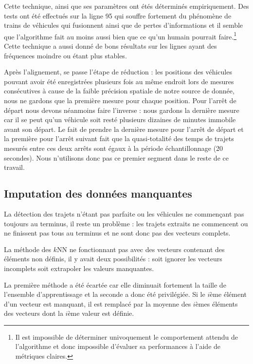 \documentclass[letterpaper]{article}
\begin{document}
\begin{appendices}
Cette technique, ainsi que ses paramètres ont étés déterminés empiriquement. Des tests ont été effectués sur la ligne 95 qui souffre fortement du phénomène de trains de véhicules qui fusionnent ainsi que de pertes d'informations et il semble que l'algorithme fait au moins aussi bien que ce qu'un humain pourrait faire.\footnote{Il est impossible de déterminer univoquement le comportement attendu de l'algorithme et donc impossible d'évaluer sa performances à l'aide de métriques claires.} Cette technique a aussi donné de bons résultats sur les lignes ayant des fréquences moindre ou étant plus stables.

Après l'alignement, se passe l'étape de réduction : les positions des véhicules pouvant avoir été enregistrées plusieurs fois au même endroit lors de mesures consécutives à cause de la faible précision spatiale de notre source de donnée, nous ne gardons que la première mesure pour chaque position. Pour l'arrêt de départ nous devons néanmoins faire l'inverse : nous gardons la dernière mesure car il se peut qu'un véhicule soit resté plusieurs dizaines de minutes immobile avant son départ. Le fait de prendre la dernière mesure pour l'arrêt de départ et la première pour l'arrêt suivant fait que la quasi-totalité des temps de trajets mesurés entre ces deux arrêts sont égaux à la période échantillonnage (20 secondes). Nous n'utilisons donc pas ce premier segment dans le reste de ce travail.


\FloatBarrier
\subsection{Imputation des données manquantes}

La détection des trajets n'étant pas parfaite ou les véhicules ne commençant pas toujours au terminus, il reste un problème : les trajets extraits ne commencent ou ne finissent pas tous au terminus et ne sont donc pas des vecteurs complets.

La méthode des $k$NN ne fonctionnant pas avec des vecteurs contenant des éléments non définis, il y avait deux possibilités : soit ignorer les vecteurs incomplets soit extrapoler les valeurs manquantes.

La première méthode a été écartée car elle diminuait fortement la taille de l'ensemble d'apprentissage et la seconde a donc été privilégiée. Si le $i$ème élément d'un vecteur est manquant, il est remplacé par la moyenne des $i$èmes éléments des vecteurs dont la $i$ème valeur est définie.



\end{appendices}
\end{document}
